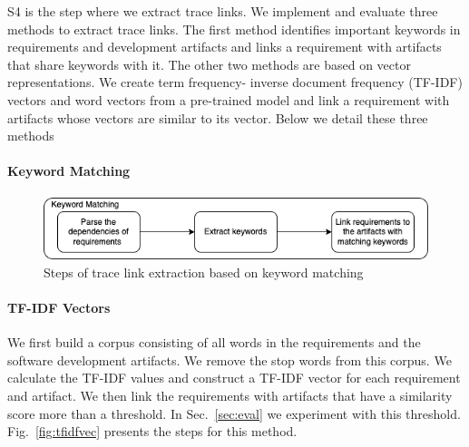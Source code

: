       \textsf{S4} is the step where we extract trace links. We implement and evaluate three methods to extract trace links. The first method identifies important keywords in requirements and development artifacts and links a requirement with artifacts that share keywords with it. The other two methods are based on vector representations. We create term frequency- inverse document frequency (TF-IDF) vectors and word vectors from a pre-trained model and link a requirement with artifacts whose vectors are similar to its vector. Below we detail these three methods %


      \paragraph{Keyword Matching}

      \begin{figure}[htb]
        \centering
        \includegraphics[width=0.99\linewidth]{figs/keywordmatching.png}
        \caption{Steps of trace link extraction based on keyword matching}
        \label{fig:keymatch}
      \end{figure}

      \paragraph{TF-IDF Vectors} We first build a corpus consisting of all words in the requirements and the software development artifacts. We remove the stop words from this corpus. We calculate the TF-IDF values and construct a TF-IDF vector for each requirement and artifact. We then link the requirements with artifacts that have a similarity score more than a threshold. In Sec.~\ref{sec:eval} we experiment with this threshold. Fig.~\ref{fig:tfidfvec} presents the steps for this method.



